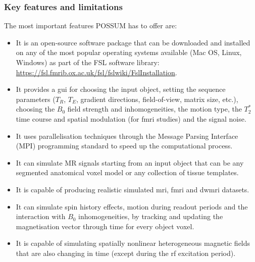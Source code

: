 \subsubsection{Key features and limitations}
The most important features POSSUM has to offer are:
\begin{itemize}
    
    \item It is an open-source software package that can be downloaded and installed on any of the most popular operating systems available (Mac OS, Linux, Windows) as part of the FSL software library: \url{https://fsl.fmrib.ox.ac.uk/fsl/fslwiki/FslInstallation}.
    
    \item It provides a \ac{gui} for choosing the input object, setting the sequence parameters ($T_R$, $T_E$, gradient directions, field-of-view, matrix size, etc.), choosing the $B_0$ field strength and inhomogeneities, the motion type, the $T_2^*$ time course and spatial modulation (for \ac{fmri} studies) and the signal noise.
    
    \item It uses parallelisation techniques through the Message Parsing Interface (MPI) programming standard to speed up the computational process.
    
    \item It can simulate MR signals starting from an input object that can be any segmented anatomical voxel model or any collection of tissue templates. %
    
    \item It is capable of producing realistic simulated \ac{mri}, \ac{fmri} and \ac{dwmri} datasets.
    
    \item It can simulate spin history effects, motion during readout periods and the interaction with $B_0$ inhomogeneities, by tracking and updating the magnetisation vector through time for every object voxel.
    
    \item It is capable of simulating spatially nonlinear heterogeneous magnetic fields that are also changing in time (except during the \ac{rf} excitation period).
    
\end{itemize}

\hfill

